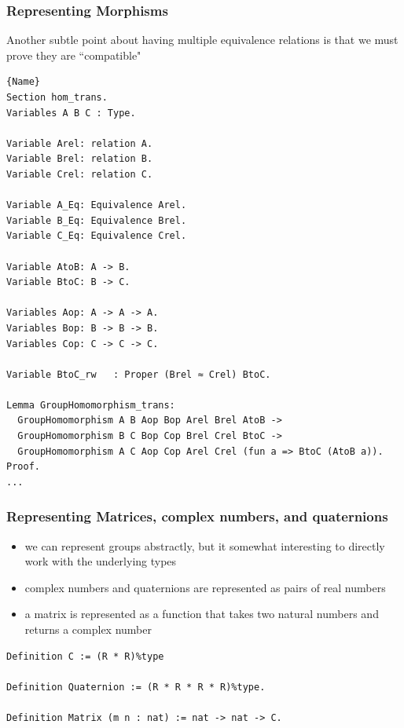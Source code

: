 \documentclass{beamer}
\begin{document}
\begin{frame}[fragile]
\frametitle{Representing Morphisms}

Another subtle point about having multiple equivalence relations is that we must prove they are ``compatible"

\begin{lstlisting}[language=Coq, basicstyle=\tiny]{Name}
Section hom_trans.
Variables A B C : Type.

Variable Arel: relation A.
Variable Brel: relation B.
Variable Crel: relation C.

Variable A_Eq: Equivalence Arel.
Variable B_Eq: Equivalence Brel.
Variable C_Eq: Equivalence Crel.

Variable AtoB: A -> B.
Variable BtoC: B -> C.

Variables Aop: A -> A -> A.
Variables Bop: B -> B -> B.
Variables Cop: C -> C -> C.

Variable BtoC_rw   : Proper (Brel ≈ Crel) BtoC.

Lemma GroupHomomorphism_trans:
  GroupHomomorphism A B Aop Bop Arel Brel AtoB ->
  GroupHomomorphism B C Bop Cop Brel Crel BtoC ->
  GroupHomomorphism A C Aop Cop Arel Crel (fun a => BtoC (AtoB a)).
Proof.
...
\end{lstlisting}

\end{frame}

\begin{frame}[fragile]
\frametitle{Representing Matrices, complex numbers, and quaternions}

\begin{itemize}
	\item we can represent groups abstractly, but it somewhat interesting to directly work with the underlying types
	\item complex numbers and quaternions are represented as pairs of real numbers
	\item a matrix is represented as a function that takes two natural numbers and returns a complex number
\end{itemize}

\begin{lstlisting}[language=Coq]
Definition C := (R * R)%type

Definition Quaternion := (R * R * R * R)%type.

Definition Matrix (m n : nat) := nat -> nat -> C.
\end{lstlisting}
\end{frame}
\end{document}
